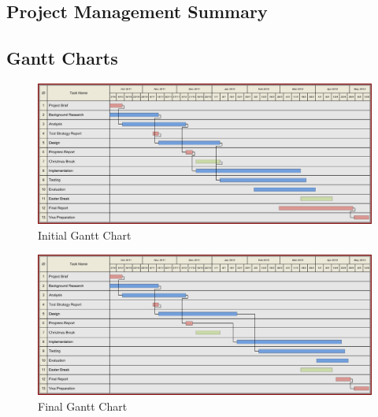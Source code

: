 \subsection{Project Management Summary}

    

\clearpage
\begin{landscape}
\subsection{Gantt Charts}
\begin{figure}[htb]
\centering
\includegraphics[scale=0.75]{img/3yp-gantt.png}
\caption{Initial Gantt Chart}
\label{fig:chart-1}
\end{figure}
\end{landscape}
\clearpage
\begin{landscape}
\begin{figure}[htb]
\centering
\includegraphics[scale=0.75]{img/3yp-gantt-final.png}
\caption{Final Gantt Chart}
\label{fig:chart-2}
\end{figure}
\end{landscape}

